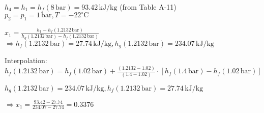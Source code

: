 \( h_4 = h_1 = h_f(8 \, \text{bar}) = 93.42 \, \text{kJ/kg} \) (from Table A-11)  
\( p_2 = p_1 = 1 \, \text{bar}, T = -22^\circ \text{C} \)  

\( x_1 = \frac{h_1 - h_f(1.2132 \, \text{bar})}{h_g(1.2132 \, \text{bar}) - h_f(1.2132 \, \text{bar})} \)  
\( \Rightarrow h_f(1.2132 \, \text{bar}) = 27.74 \, \text{kJ/kg}, h_g(1.2132 \, \text{bar}) = 234.07 \, \text{kJ/kg} \)  

Interpolation:  
\( h_f(1.2132 \, \text{bar}) = h_f(1.02 \, \text{bar}) + \frac{(1.2132 - 1.02)}{(1.4 - 1.02)} \cdot [h_f(1.4 \, \text{bar}) - h_f(1.02 \, \text{bar})] \)  

\( h_g(1.2132 \, \text{bar}) = 234.07 \, \text{kJ/kg}, h_f(1.2132 \, \text{bar}) = 27.74 \, \text{kJ/kg} \)  

\( \Rightarrow x_1 = \frac{93.42 - 27.74}{234.07 - 27.74} = 0.3376 \)